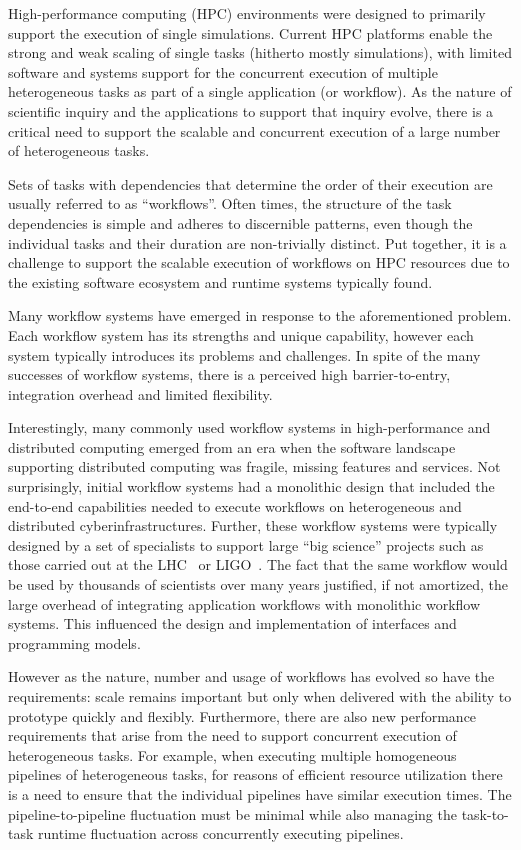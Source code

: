 \documentclass[conference]{IEEEtran}
\begin{document}
High-performance computing (HPC) environments were designed to primarily
support the execution of single simulations. Current HPC platforms enable the
strong and weak scaling of single tasks (hitherto mostly simulations), with
limited software and systems support for the concurrent execution of multiple
heterogeneous tasks as part of a single application (or workflow). As the
nature of scientific inquiry and the applications to support that inquiry
evolve, there is a critical need to support the scalable and concurrent
execution of a large number of heterogeneous tasks.

Sets of tasks with dependencies that determine the order of their execution
are usually referred to as ``workflows''. Often times, the structure of the
task dependencies is simple and adheres to discernible patterns, even though
the individual tasks and their duration are non-trivially distinct. Put
together, it is a challenge to support the scalable execution of workflows on
HPC resources due to the existing software ecosystem and runtime systems
typically found.

Many workflow systems have emerged in response to the aforementioned problem.
Each workflow system has its strengths and unique capability, however each
system typically introduces its problems and challenges. In spite of the many
successes of workflow systems, there is a perceived high barrier-to-entry,
integration overhead and limited flexibility.

Interestingly, many commonly used workflow systems in high-performance and
distributed computing emerged from an era when the software landscape
supporting distributed computing was fragile, missing features and services.
Not surprisingly, initial workflow systems had a monolithic design that
included the end-to-end capabilities needed to execute workflows on
heterogeneous and distributed cyberinfrastructures. Further, these workflow
systems were typically designed by a set of specialists to support large
``big science'' projects such as those carried out at the
LHC~\cite{breskin2009cern} or LIGO~\cite{althouse1992ligo}. The fact that the
same workflow would be used by thousands of scientists over many years
justified, if not amortized, the large overhead of integrating application
workflows with monolithic workflow systems. This influenced the design and
implementation of interfaces and programming models.

However as the nature, number and usage of workflows has evolved so have the
requirements: scale remains important but only when delivered with the
ability to prototype quickly and flexibly. Furthermore, there are also new
performance requirements that arise from the need to support concurrent
execution of heterogeneous tasks. For example, when executing multiple
homogeneous pipelines of heterogeneous tasks, for reasons of efficient
resource utilization there is a need to ensure that the individual pipelines
have similar execution times. The pipeline-to-pipeline fluctuation must be
minimal while also managing the task-to-task runtime fluctuation across
concurrently executing pipelines.
\end{document}

